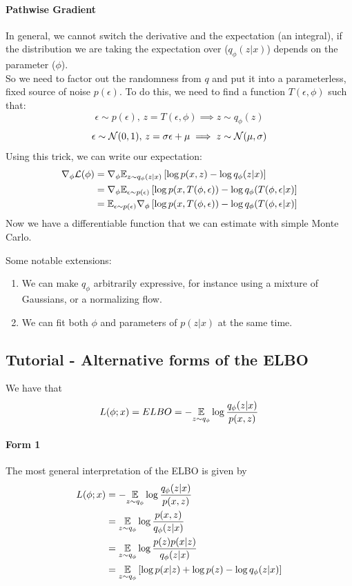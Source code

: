\documentclass[11pt]{article}
\begin{document}
\paragraph{Pathwise Gradient}
In general, we cannot switch the derivative and the expectation (an integral), if the distribution we are taking the expectation over ($q_\phi(z|x)$) depends on the parameter ($\phi$). \\
So we need to factor out the randomness from $q$ and put it into a parameterless, fixed source of noise $p(\epsilon)$. To do this, we need to find a function $T(\epsilon, \phi)$ such that:
$$\epsilon \sim p(\epsilon), \, z = T(\epsilon, \phi) \implies z \sim q_\phi(z)$$
\remark
{}
\example
$$\epsilon \sim \mathcal{N}(0,1),\,z = \sigma \epsilon + \mu \implies z \sim \mathcal{N}(\mu, \sigma)$$
Using this trick, we can write our expectation:
\begin{align*}
	\nabla_\phi \mathcal{L}(\phi) &= \nabla_\phi \mathbb{E}_{z \sim q_\phi(z|x)}\left[ \log p(x,z) - \log q_\phi (z|x)\right] \\
	&= \nabla_\phi \mathbb{E}_{\epsilon \sim p(\epsilon)} \left[ \log p(x, T(\phi, \epsilon)) - \log q_\phi (T(\phi, \epsilon |x)\right]\\
	&= \mathbb{E}_{\epsilon \sim p(\epsilon)} \nabla_\phi \left[ \log p(x, T(\phi, \epsilon)) - \log q_\phi (T(\phi, \epsilon |x)\right]
\end{align*}
Now we have a differentiable function that we can estimate with simple Monte Carlo. 

\remark
Some notable extensions:
\begin{enumerate}
	\item We can make $q_\phi$ arbitrarily expressive, for instance using a mixture of Gaussians, or a normalizing flow.
	\item We can fit both $\phi$ and parameters of $p(z|x)$ at the same time.
\end{enumerate}
\subsection{Tutorial - Alternative forms of the ELBO}
We have that 
$$L(\phi; x) = ELBO = - \underset{z\sim q_\phi}{\mathbb{E}} \log \frac{q_\phi(z|x)}{p(x,z)}$$
\paragraph{Form 1}
The most general interpretation of the ELBO is given by
\begin{align*}
	L(\phi; x) &= - \underset{z\sim q_\phi}{\mathbb{E}} \log \frac{q_\phi(z|x)}{p(x,z)}\\
	&= \underset{z\sim q_\phi}{\mathbb{E}} \log \frac{p(x,z)}{q_\phi(z|x)} \\
	&= \underset{z\sim q_\phi}{\mathbb{E}} \log \frac{p(z)p(x|z)}{q_\phi(z|x)} \\
	&= \underset{z\sim q_\phi}{\mathbb{E}} \left[ \log p(x|z) + \log p(z) - \log q_\phi(z|x)\right]
\end{align*}
\end{document}
